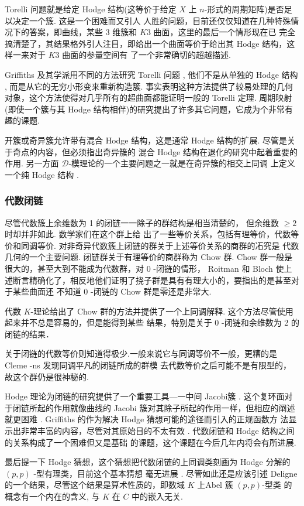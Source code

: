 \documentclass[UTF8,AutoFakeBold,scheme=chinese,eversion]{GXMU-Thesis}
\begin{document}
Torelli 问题就是给定 Hodge 结构(这等价于给定 $X$ 上 $n$-形式的周期矩阵)是否足以决定一个簇. 这是一个困难而又引人 人胜的问题，目前还仅仅知道在几种特殊情况下的答案，即曲线，某些 3 维簇和 $K 3$ 曲面，这里的最后一个情形现在已 完全搞清楚了，其结果格外引人注目，即给出一个曲面等价于给出其 Hodge 结构，这样一来对于 $K 3$ 曲面的参量空间有 了一个非常确切的超越描述.

Griffiths 及其学派用不同的方法研究 Torelli 问题 , 他们不是从单独的 Hodge 结构 , 而是从它的无穷小形变来重新构造簇. 事实表明这种方法提供了较易处理的几何对象，这个方法使得对几乎所有的超曲面都能证明一般的 Torelli 定理.
周期映射(即使一个簇与其 Hodge 结构相伴)的研究提出了许多其它问题，它成为个非常有趣的课题.

开簇或奇异簇允许带有混合 Hodge 结构，这是通常 Hodge 结构的扩展. 尽管是关于奇点的内容，但必须指出奇异簇的 混合 Hodge 结构在退化的研究中起着重要的作用. 另一方面 $\mathscr{D}$-模理论的一个主要问题之一就是在奇异簇的相交上同调 上定义一个纯 Hodge 结构 .
\subsubsection{代数闭链}

尽管代数簇上余维数为 1 的闭链一一除子的群结构是相当清楚的， 但余维数 $\geq 2$ 时却并非如此. 数学家们在这个群上给 出了一些等价关系，包括有理等价，代数等价和同调等价. 对非奇异代数簇上闭链的群关于上述等价关系的商群的㓈究是 代数几何的一个主要问题.
闭链群关于有理等价的商群称为 Chow 群. Chow 群一般是很大的，甚至大到不能成为代数群，对 0 -闭链的情形，
Roitman 和 Bloch 使上述断言精确化了，相反地他们证明了挠子群是具有有理大小的，要指出的是甚至对于某些曲面还 不知道 0 -闭链的 Chow 群是零还是非常大.

代数 $K$-理论给出了 Chow 群的方法并提供了一个上同调解释. 这个方法尽管使用起来并不总是容易的，但是能得到某些 结果，特别是关于 0 -闭链和余维数为 2 的闭链的结果．

关于闭链的代数等价则知道得极少.一般来说它与同调等价不一般，更糟的是 Cleme -ns 发现同调平凡的闭链所成的群模 去代数等价之后可能不是有限型的，故这个群仍是很神秘的.

Hodge 理论为闭链的研究提供了一个重要工具—一中间 Jacobi簇 . 这个复环面对于闭链所起的作用就像曲线的 Jacobi 簇对其除子所起的作用一样，但相应的阐述就更困难 . Griffiths 的作为解决 Hodge 猜想可能的途径而引入的正规函数方 法显示出非常丰富的内容，尽管对其原始目的不太有效 . 代数闭链和 Hodge 结构之间的关系构成了一个困难但又是基础 的课题，这个课题在今后几年内将会有所进展.

最后提一下 Hodge 猜想，这个猜想把代数闭链的上同调类刻画为 Hodge 分解的 $(p, p)$ -型有理类，目前这个基本猜想 毫无进展 . 尽管如此还是应该引述 Deligne 的一个结果，尽管这个结果是算术性质的，即数域 $K$ 上Abel 簇 $(p, p)$-型类 的概念有一个内在的含义, 与 $K$ 在 $C$ 中的嵌入无关.\cite{DaishujiheGeometrieAlgebrique}
\end{document}
